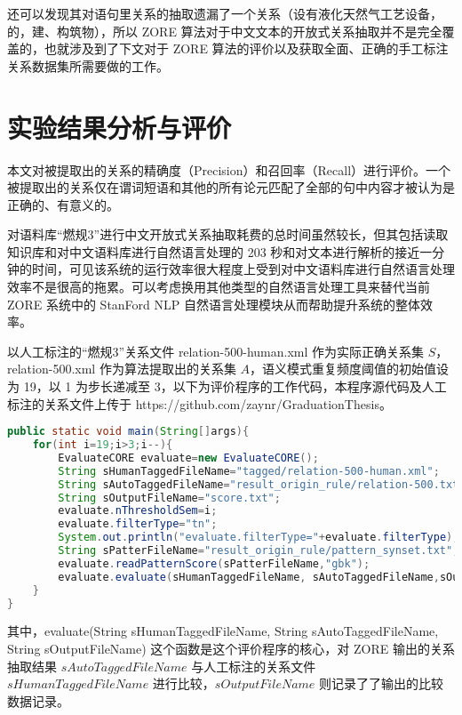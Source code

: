 还可以发现其对语句里关系的抽取遗漏了一个关系（设有液化天然气工艺设备，的，建、构筑物），所以 ZORE 算法对于中文文本的开放式关系抽取并不是完全覆盖的，也就涉及到了下文对于 ZORE 算法的评价以及获取全面、正确的手工标注关系数据集所需要做的工作。

\section{实验结果分析与评价}
本文对被提取出的关系的精确度（Precision）和召回率（Recall）进行评价。一个被提取出的关系仅在谓词短语和其他的所有论元匹配了全部的句中内容才被认为是正确的、有意义的。

对语料库“燃规3”进行中文开放式关系抽取耗费的总时间虽然较长，但其包括读取知识库和对中文语料库进行自然语言处理的 203 秒和对文本进行解析的接近一分钟的时间，可见该系统的运行效率很大程度上受到对中文语料库进行自然语言处理效率不是很高的拖累。可以考虑换用其他类型的自然语言处理工具来替代当前 ZORE 系统中的 StanFord NLP 自然语言处理模块从而帮助提升系统的整体效率。

以人工标注的“燃规3”关系文件 relation-500-human.xml 作为实际正确关系集 $S$，relation-500.xml 作为算法提取出的关系集 $A$，语义模式重复频度阈值的初始值设为 19，以 1 为步长递减至 3，以下为评价程序的工作代码，本程序源代码及人工标注的关系文件上传于 https://github.com/zaynr/GraduationThesis。

\begin{lstlisting}[language=java, caption=评价程序, breaklines=true, label={code:evaluate}]
public static void main(String[]args){
    for(int i=19;i>3;i--){
        EvaluateCORE evaluate=new EvaluateCORE();
        String sHumanTaggedFileName="tagged/relation-500-human.xml";
        String sAutoTaggedFileName="result_origin_rule/relation-500.txt";
        String sOutputFileName="score.txt";
        evaluate.nThresholdSem=i;
        evaluate.filterType="tn";
        System.out.println("evaluate.filterType="+evaluate.filterType);
        String sPatterFileName="result_origin_rule/pattern_synset.txt";
        evaluate.readPatternScore(sPatterFileName,"gbk");
        evaluate.evaluate(sHumanTaggedFileName, sAutoTaggedFileName,sOutputFileName);
    }
}
\end{lstlisting}

其中，evaluate(String sHumanTaggedFileName, String sAutoTaggedFileName, String sOutputFileName) 这个函数是这个评价程序的核心，对 ZORE 输出的关系抽取结果 $sAutoTaggedFileName$ 与人工标注的关系文件 $sHumanTaggedFileName$ 进行比较，$sOutputFileName$ 则记录了了输出的比较数据记录。

